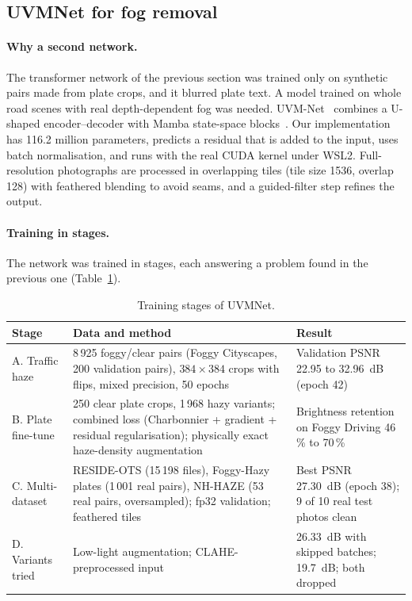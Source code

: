 \subsection{UVMNet for fog removal}
\label{sec:uvm}

\paragraph{Why a second network.} The transformer network of the previous
section was trained only on synthetic pairs made from plate crops, and it
blurred plate text. A model trained on whole road scenes with real depth-dependent
fog was needed. UVM-Net~\cite{zheng2024uvmnet} combines a U-shaped
encoder--decoder with Mamba state-space blocks~\cite{gu2023mamba}. Our
implementation has 116.2 million parameters, predicts a residual that is added
to the input, uses batch normalisation, and runs with the real 
CUDA kernel under WSL2. Full-resolution photographs are processed in
overlapping tiles (tile size 1536, overlap 128) with feathered blending to avoid
seams, and a guided-filter step refines the output.

\paragraph{Training in stages.} The network was trained in stages, each answering
a problem found in the previous one (Table~\ref{tab:uvmstages}).

\begin{table}[t]
\centering
\caption{Training stages of UVMNet.}
\label{tab:uvmstages}
\small
\begin{tabularx}{\textwidth}{@{}p{2.1cm}X p{3.0cm}@{}}
\toprule
\textbf{Stage} & \textbf{Data and method} & \textbf{Result}\\
\midrule
A. Traffic haze & 8\,925 foggy/clear pairs (Foggy Cityscapes, 200 validation pairs), $384\times384$ crops with flips, mixed precision, 50 epochs & Validation PSNR 22.95 to 32.96~dB (epoch 42)\\
B. Plate fine-tune & 250 clear plate crops, 1\,968 hazy variants; combined loss (Charbonnier + gradient + residual regularisation); physically exact haze-density augmentation & Brightness retention on Foggy Driving 46\,\% to 70\,\%\\
C. Multi-dataset & RESIDE-OTS (15\,198 files), Foggy-Hazy plates (1\,001 real pairs), NH-HAZE (53 real pairs, oversampled); fp32 validation; feathered tiles & Best PSNR 27.30~dB (epoch 38); 9 of 10 real test photos clean\\
D. Variants tried & Low-light augmentation; CLAHE-preprocessed input & 26.33~dB with skipped batches; 19.7~dB; both dropped\\
\bottomrule
\end{tabularx}
\end{table}

